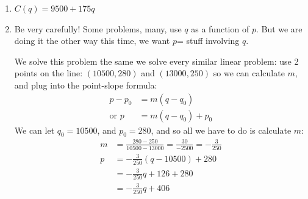 \documentclass[oneside]{book}
\theoremstyle{definition}
\theoremstyle{solution}
\newtheorem*{solution}{Solution}
\newenvironment{solution}{\vspace{2in}\comment}{\endcomment}
\begin{document}
\begin{solution}
  \begin{enumerate}
  \item $C(q) = 9500+175q$
  \item Be very carefully!  Some problems, many, use $q$ as a function
    of $p$.  But we are doing it the other way this time, we want $p$=
    stuff involving $q$.

    We solve this problem the same we solve every similar linear
    problem: use 2 points on the line: $(10500,280)$ and $(13000,250)$
    so we can calculate $m$, and plug into the point-slope formula:
\begin{align*}
  p-p_0 & = m(q-q_0)\\
  \text{or }p & = m(q-q_0)+p_0
\end{align*}
We can let $q_0=10500$, and $p_0=280$, and so all we have to do is
calculate $m$:
\begin{align*}
  m & = \frac{280-250}{10500-13000} = \frac{30}{-2500} = -\frac{3}{250}\\
  p & = -\frac{3}{250}(q-10500) +280\\
    & = -\frac{3}{250}q + 126 + 280\\
    & = -\frac{3}{250}q + 406\\
\end{align*}


\end{enumerate}
\end{solution}
\end{document}
